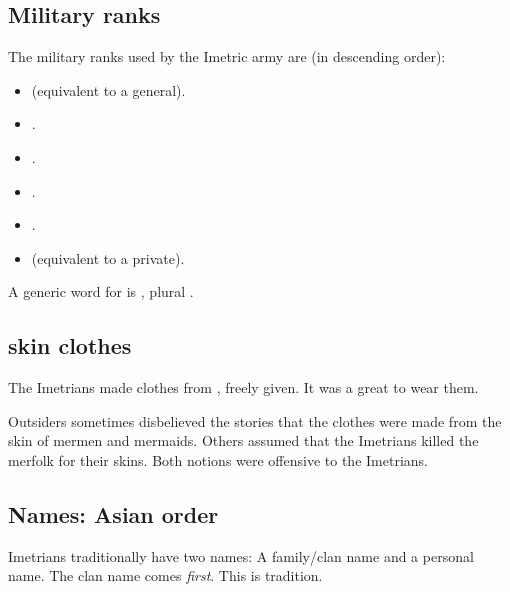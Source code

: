 \subsection{Military ranks}
The military ranks used by the Imetric army are (in descending order): 

\begin{itemize}
  \item \Deccor{} (equivalent to a general). 
  \item \Retaxis{}. 
  \item \Salican{}. 
  \item \Vexstra{}. 
  \item \Corphin{}. 
  \item \Inclan{} (equivalent to a private). 
\end{itemize}



A generic word for  is \Rengos, plural \Rengoi. 









\subsection{\Naga skin clothes}
The Imetrians made clothes from , freely given. 
It was a great \honour to wear them. 

Outsiders sometimes disbelieved the stories that the clothes were made from the skin of mermen and mermaids. 
Others assumed that the Imetrians killed the merfolk for their skins. 
Both notions were offensive to the Imetrians. 









\subsection{Names: Asian order}
Imetrians traditionally have two names: 
A family/clan name and a personal name. 
The clan name comes \emph{first}. 
This is \Ortaican{} tradition. 









